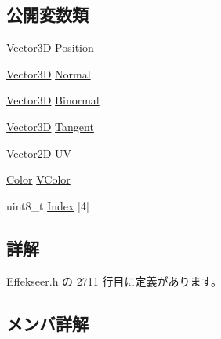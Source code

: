 \subsection*{公開変数類}
\begin{DoxyCompactItemize}
\item 
\mbox{\hyperlink{struct_effekseer_1_1_vector3_d}{Vector3D}} \mbox{\hyperlink{struct_effekseer_1_1_model_1_1_vertex_with_index_a22384cf486e5836ecaa7e44223d48030}{Position}}
\item 
\mbox{\hyperlink{struct_effekseer_1_1_vector3_d}{Vector3D}} \mbox{\hyperlink{struct_effekseer_1_1_model_1_1_vertex_with_index_a62d6f178cabfca2b4804db18808d1f42}{Normal}}
\item 
\mbox{\hyperlink{struct_effekseer_1_1_vector3_d}{Vector3D}} \mbox{\hyperlink{struct_effekseer_1_1_model_1_1_vertex_with_index_ab5eaf1806d47de81ab10b5c0dc657e33}{Binormal}}
\item 
\mbox{\hyperlink{struct_effekseer_1_1_vector3_d}{Vector3D}} \mbox{\hyperlink{struct_effekseer_1_1_model_1_1_vertex_with_index_a851f79cd3d0e50a5e8dd6e0cec83d7bf}{Tangent}}
\item 
\mbox{\hyperlink{struct_effekseer_1_1_vector2_d}{Vector2D}} \mbox{\hyperlink{struct_effekseer_1_1_model_1_1_vertex_with_index_a38ec916ab361fc5ce55283cf6e89c941}{UV}}
\item 
\mbox{\hyperlink{struct_effekseer_1_1_color}{Color}} \mbox{\hyperlink{struct_effekseer_1_1_model_1_1_vertex_with_index_aff987e0ba3b15c7682072f054860d2bc}{V\+Color}}
\item 
uint8\+\_\+t \mbox{\hyperlink{struct_effekseer_1_1_model_1_1_vertex_with_index_aa9ba7ef223b374fd22c07b0be4a89ee2}{Index}} \mbox{[}4\mbox{]}
\end{DoxyCompactItemize}


\subsection{詳解}


 Effekseer.\+h の 2711 行目に定義があります。



\subsection{メンバ詳解}
\mbox{\label{struct_effekseer_1_1_model_1_1_vertex_with_index_ab5eaf1806d47de81ab10b5c0dc657e33}} 
